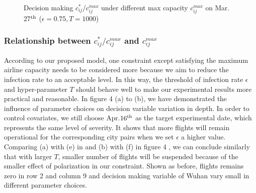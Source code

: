\begin{figure}[H]
    \centering
    \caption{Decision making $c_{ij}^* / c_{ij}^{max}$ under different max capacity $c_{ij}^{max}$ on Mar. 27$^{\rm th}$ ($\epsilon=0.75,T=1000$)}
    \label{fig:my_label}
\end{figure}



\subsubsection{Relationship between $c_{ij}^* / c_{ij}^{max}$ and $c_{ij}^{max}$}
According to our proposed model, one constraint except satisfying the maximum airline capacity needs to be considered more because we aim to reduce the infection rate to an acceptable level. In this way, the threshold of infection rate $\epsilon$ and hyper-parameter $T$ should behave well to make our experimental results more practical and reasonable. In figure 4 (a) to (b), we have demonstrated the influence of parameter choices on decision variable variation in depth. In order to control covariates, we still choose Apr.$16^{\rm th}$ as the target experimental date, which represents the same level of severity. It shows that more flights will remain operational for the corresponding city pairs when we set $\epsilon$ a higher value. Comparing (a) with (e) in and (b) with (f) in figure 4 , we can conclude similarly that with larger $T$, smaller number of flights will be suspended because of the smaller effect of polarization in our constraint. Shown as before, flights remains zero in row 2 and column 9 and decision making variable of Wuhan vary small in different parameter choices.

